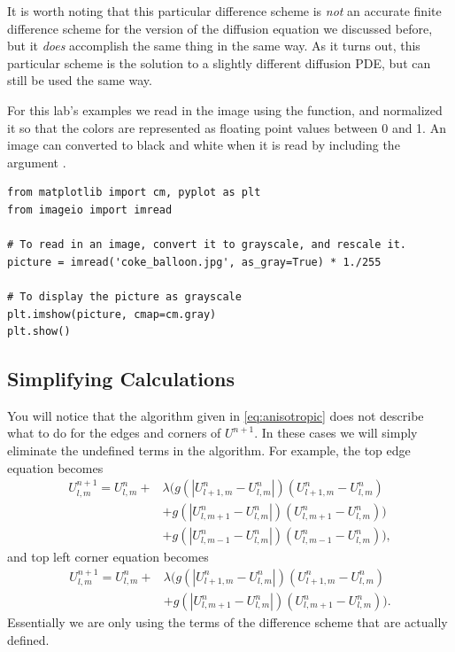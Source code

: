 It is worth noting that this particular difference scheme is \textit{not} an accurate finite difference scheme for the version of the diffusion equation we discussed before, but it \textit{does} accomplish the same thing in the same way.
As it turns out, this particular scheme is the solution to a slightly different diffusion PDE, but can still be used the same way.

For this lab's examples we read in the image using the  function, and normalized it so that the colors are represented as floating point values between 0 and 1.
An image can converted to black and white when it is read by including the argument .

\begin{lstlisting}
from matplotlib import cm, pyplot as plt
from imageio import imread

# To read in an image, convert it to grayscale, and rescale it.
picture = imread('coke_balloon.jpg', as_gray=True) * 1./255

# To display the picture as grayscale
plt.imshow(picture, cmap=cm.gray)
plt.show()
\end{lstlisting}

\subsection*{Simplifying Calculations}\label{sec:simp}

You will notice that the algorithm given in \ref{eq:anisotropic} does not describe what to do for the edges and corners of $U^{n+1}$.
In these cases we will simply eliminate the undefined terms in the algorithm.
For example, the top edge equation becomes
\begin{align*}
U_{l,m}^{n+1} = U_{l,m}^n + & \lambda (g(|U_{l+1,m}^n - U_{l,m}^n|)(U_{l+1,m}^n - U_{l,m}^n) \\
                    & + g(|U_{l,m+1}^n - U_{l,m}^n|)(U_{l,m+1}^n - U_{l,m}^n)) \\
					& + g(|U_{l,m-1}^n - U_{l,m}^n|)(U_{l,m-1}^n - U_{l,m}^n)),
\end{align*}
and top left corner equation becomes
\begin{align*}
U_{l,m}^{n+1} = U_{l,m}^n + & \lambda (g(|U_{l+1,m}^n - U_{l,m}^n|)(U_{l+1,m}^n - U_{l,m}^n) \\
					& + g(|U_{l,m+1}^n - U_{l,m}^n|)(U_{l,m+1}^n - U_{l,m}^n)).
\end{align*}
Essentially we are only using the terms of the difference scheme that are actually defined.

